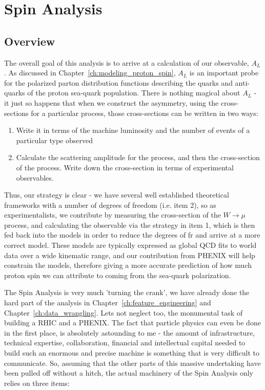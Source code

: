 \chapter{Spin Analysis}
\label{ch:spin_analysis}
\section{Overview}

The overall goal of this analysis is to arrive at a calculation of our
observable, $A_L$. As discussed in Chapter~\ref{ch:modeling_proton_spin}, $A_L$
is an important probe for the polarized parton distribution functions describing
the quarks and anti-quarks of the proton sea-quark population. There is nothing
magical about $A_L$ - it just so happens that when we construct the asymmetry,
using the cross-sections for a particular process, those cross-sections can be
written in two ways:

\begin{enumerate}
  \item Write it in terms of the machine luminosity and the number of events of
    a particular type observed
  \item Calculate the scattering amplitude for the process, and then the
    cross-section of the process. Write down the cross-section in terms of
    experimental observables.
\end{enumerate}

Thus, our strategy is clear - we have several well established theoretical
frameworks with a number of degrees of freedom (i.e. item 2), so as
experimentalists, we contribute by measuring the cross-section of the
$W\rightarrow\mu$ process, and calculating the observable via the strategy in
item 1, which is then fed back into the models in order to reduce the degrees of
fr and arrive at a more correct model. These models are typically expressed as
global QCD fits to world data over a wide kinematic range, and our contribution
from PHENIX will help constrain the models, therefore giving a more accurate
prediction of how much proton spin we can attribute to coming from the sea-quark
polarization.

The Spin Analysis is very much 'turning the crank', we have already done the
hard part of the analysis in Chapter~\ref{ch:feature_engineering} and
Chapter~\ref{ch:data_wrangling}. Lets not neglect too, the monumental task of
building a RHIC and a PHENIX. The fact that particle physics can even be done
in the first place, is absolutely astounding to me - the amount of
infrastructure, technical expertise, collaboration, financial and intellectual
capital needed to build such an enormous and precise machine is something that
is very difficult to communicate. So, assuming that the other parts of this
massive undertaking have been pulled off without a hitch, the actual machinery
of the Spin Analysis only relies on three items:


